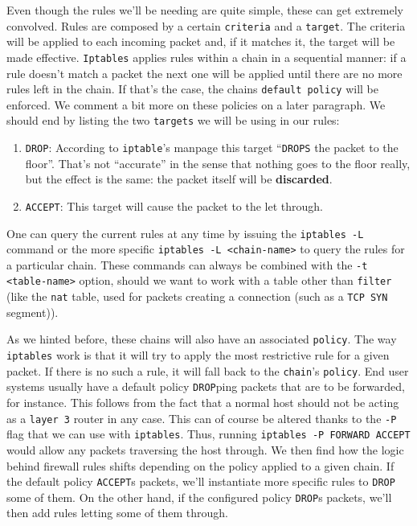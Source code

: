             Even though the rules we'll be needing are quite simple, these can get extremely convolved. Rules are composed by a certain \texttt{criteria} and a \texttt{target}. The criteria will be applied to each incoming packet and, if it matches it, the target will be made effective. \texttt{Iptables} applies rules within a chain in a sequential manner: if a rule doesn't match a packet the next one will be applied until there are no more rules left in the chain. If that's the case, the chains \texttt{default policy} will be enforced. We comment a bit more on these policies on a later paragraph. We should end by listing the two \texttt{targets} we will be using in our rules:

            \begin{enumerate}
                \item \texttt{DROP}: According to \texttt{iptable}'s manpage this target ``\texttt{DROPS} the packet to the floor''. That's not ``accurate'' in the sense that nothing goes to the floor really, but the effect is the same: the packet itself will be \textbf{discarded}.
                \item \texttt{ACCEPT}: This target will cause the packet to the let through.
            \end{enumerate}

            One can query the current rules at any time by issuing the \texttt{iptables -L} command or the more specific \texttt{iptables -L <chain-name>} to query the rules for a particular chain. These commands can always be combined with the \texttt{-t <table-name>} option, should we want to work with a table other than \texttt{filter} (like the \texttt{nat} table, used for packets creating a connection (such as a \texttt{TCP SYN} segment)).

            As we hinted before, these chains will also have an associated \texttt{policy}. The way \texttt{iptables} work is that it will try to apply the most restrictive rule for a given packet. If there is no such a rule, it will fall back to the \texttt{chain}'s \texttt{policy}. End user systems usually have a default policy \texttt{DROP}ping packets that are to be forwarded, for instance. This follows from the fact that a normal host should not be acting as a \texttt{layer 3} router in any case. This can of course be altered thanks to the \texttt{-P} flag that we can use with \texttt{iptables}. Thus, running \texttt{iptables -P FORWARD ACCEPT} would allow any packets traversing the host through. We then find how the logic behind firewall rules shifts depending on the policy applied to a given chain. If the default policy \texttt{ACCEPT}s packets, we'll instantiate more specific rules to \texttt{DROP} some of them. On the other hand, if the configured policy \texttt{DROP}s packets, we'll then add rules letting some of them through.

